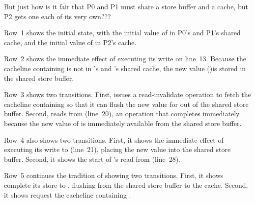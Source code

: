 \QuickQuiz{}
	But just how is it fair that P0 and P1 must share a store buffer
	and a cache, but P2 gets one each of its very own???
 \QuickQuizEnd

Row~1 shows the initial state, with the initial value of  in
P0's and P1's shared cache, and the initial value of  in
P2's cache.

Row~2 shows the immediate effect of  executing its write on line~13.
Because the cacheline containing  is not in 's and 's
shared cache, the new value ()is stored in the shared store buffer.

Row~3 shows two transitions.
First,  issues a read-invalidate operation to fetch the cacheline
containing  so that it can flush the new value for  out of
the shared store buffer.
Second,  reads from  (line~20), an operation that completes
immediately because the new value of  is immediately available
from the shared store buffer.

Row~4 also shows two transitions.
First, it shows the immediate effect of  executing its write to
 (line~21), placing the new value into the shared store buffer.
Second, it shows the start of 's read from  (line~28).

Row~5 continues the tradition of showing two transitions.
First, it shows  complete its store to , flushing
from the shared store buffer to the cache.
Second, it shows  request the cacheline containing .

